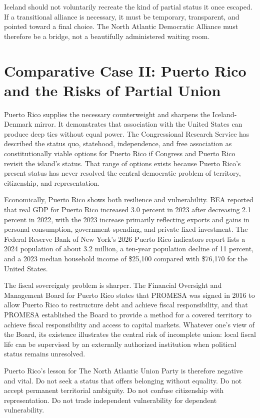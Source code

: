 \documentclass[11pt,a4paper]{article}
\newcommand{\PartyEN}{The North Atlantic Union Party}
\begin{document}
Iceland should not voluntarily recreate the kind of partial status it once escaped. If a transitional alliance is necessary, it must be temporary, transparent, and pointed toward a final choice. The North Atlantic Democratic Alliance must therefore be a bridge, not a beautifully administered waiting room.

\section{Comparative Case II: Puerto Rico and the Risks of Partial Union}
Puerto Rico supplies the necessary counterweight and sharpens the Iceland-Denmark mirror. It demonstrates that association with the United States can produce deep ties without equal power. The Congressional Research Service has described the status quo, statehood, independence, and free association as constitutionally viable options for Puerto Rico if Congress and Puerto Rico revisit the island's status.\cite{crspuertorico} That range of options exists because Puerto Rico's present status has never resolved the central democratic problem of territory, citizenship, and representation.

Economically, Puerto Rico shows both resilience and vulnerability. BEA reported that real GDP for Puerto Rico increased 3.0 percent in 2023 after decreasing 2.1 percent in 2022, with the 2023 increase primarily reflecting exports and gains in personal consumption, government spending, and private fixed investment.\cite{beapuertorico} The Federal Reserve Bank of New York's 2026 Puerto Rico indicators report lists a 2024 population of about 3.2 million, a ten-year population decline of 11 percent, and a 2023 median household income of \$25,100 compared with \$76,170 for the United States.\cite{nyfedpuertorico}

The fiscal sovereignty problem is sharper. The Financial Oversight and Management Board for Puerto Rico states that PROMESA was signed in 2016 to allow Puerto Rico to restructure debt and achieve fiscal responsibility, and that PROMESA established the Board to provide a method for a covered territory to achieve fiscal responsibility and access to capital markets.\cite{fombpromesa} Whatever one's view of the Board, its existence illustrates the central risk of incomplete union: local fiscal life can be supervised by an externally authorized institution when political status remains unresolved.

Puerto Rico's lesson for \PartyEN{} is therefore negative and vital. Do not seek a status that offers belonging without equality. Do not accept permanent territorial ambiguity. Do not confuse citizenship with representation. Do not trade independent vulnerability for dependent vulnerability.
\end{document}
